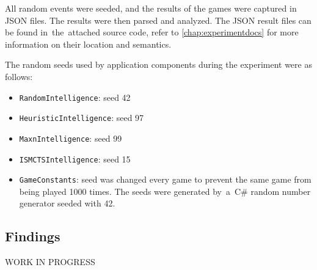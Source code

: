 All random events were seeded, and the results of the games were captured in JSON
files.
The results were then parsed and analyzed. The JSON result files can be found
in~the~attached source code, refer to \autoref{chap:experimentdocs} for more information
on their location and semantics.

The random seeds used by application components during the experiment were as follows:
\begin{itemize}
    \item \texttt{RandomIntelligence}: seed 42
    \item \texttt{HeuristicIntelligence}: seed 97
    \item \texttt{MaxnIntelligence}: seed 99
    \item \texttt{ISMCTSIntelligence}: seed 15
    \item \texttt{GameConstants}: seed was changed every game to prevent the same game from
        being played 1000 times. The seeds were generated by~a~C\# 
        random number generator seeded with 42.
\end{itemize}

\subsection{Findings}

WORK IN PROGRESS
